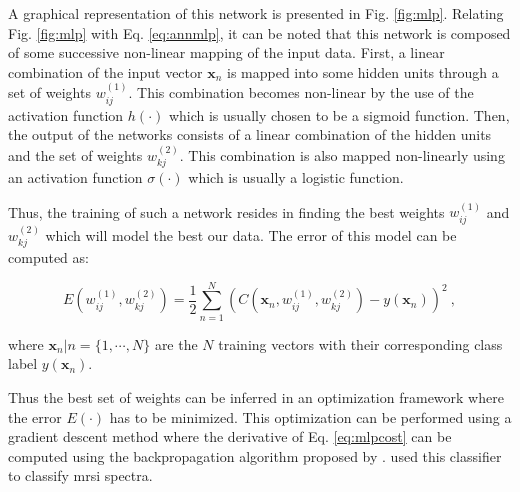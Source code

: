 \begin{enumerate}[leftmargin=*]
A graphical representation of this network is presented in Fig. \ref{fig:mlp}. Relating Fig. \ref{fig:mlp} with Eq. \eqref{eq:annmlp}, it can be noted that this network is composed of some successive non-linear mapping of the input data. First, a linear combination of the input vector $\mathbf{x}_n$ is mapped into some hidden units through a set of weights $w_{ij}^{(1)}$. This combination becomes non-linear by the use of the activation function $h(\cdot)$ which is usually chosen to be a sigmoid function. Then, the output of the networks consists of a linear combination of the hidden units and the set of weights $w_{kj}^{(2)}$. This combination is also mapped non-linearly using an activation function $\sigma(\cdot)$ which is usually a logistic function.

Thus, the training of such a network resides in finding the best weights $w_{ij}^{(1)}$ and $ w_{kj}^{(2)}$ which will model the best our data. The error of this model can be computed as:

\begin{equation}
	E(w_{ij}^{(1)},w_{kj}^{(2)}) = \frac{1}{2} \sum_{n=1}^{N} \left( C(\mathbf{x}_n,w_{ij}^{(1)},w_{kj}^{(2)}) - y(\mathbf{x}_n) \right) ^{2} \ ,
	\label{eq:mlpcost}
\end{equation}

\noindent where $\mathbf{x}_n|n=\{1,\cdots,N\}$ are the $N$ training vectors with their corresponding class label $y(\mathbf{x}_n)$.

Thus the best set of weights can be inferred in an optimization framework where the error $E(\cdot)$ has to be minimized. This optimization can be performed using a gradient descent method where the derivative of Eq. \eqref{eq:mlpcost} can be computed using the backpropagation algorithm proposed by \cite{Rumelhart1988}. \cite{Matulewicz2013,Parfait2012} used this classifier to classify \ac{mrsi} spectra.

\begin{figure}
\centering
\def\layersep{3cm}
\def\finallayersep{2.2cm}
\end{figure}
\end{enumerate}
